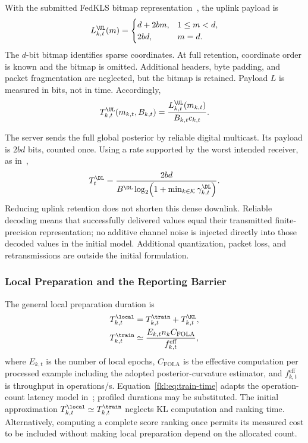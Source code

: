 With the submitted FedKLS bitmap representation~\cite[Sec.~II-B]{fedkls}, the uplink payload is
\begin{equation}
 L_{k,t}^{\UL}(m)=
 \begin{cases}
 d+2bm,&1\le m<d,\\
 2bd,&m=d.
 \end{cases}
 \label{fkl:eq:uplink-payload}
\end{equation}
The $d$-bit bitmap identifies sparse coordinates. At full retention, coordinate order is known and the bitmap is omitted. Additional headers, byte padding, and packet fragmentation are neglected, but the bitmap is retained. Payload $L$ is measured in bits, not in time. Accordingly,
\begin{equation}
 T_{k,t}^{\UL}(m_{k,t},B_{k,t})
 =\frac{L_{k,t}^{\UL}(m_{k,t})}{B_{k,t}c_{k,t}}.
 \label{fkl:eq:upload-time}
\end{equation}

The server sends the full global posterior by reliable digital multicast. Its payload is $2bd$ bits, counted once. Using a rate supported by the worst intended receiver, as in~\cite[Eqs.~(4)--(5)]{scheduling},
\begin{equation}
 T_t^{\DL}=\frac{2bd}{B^{\DL}\log_2\!\left(
 1+\min_{k\in\mathcal K}\gamma_{k,t}^{\DL}\right)}.
 \label{fkl:eq:downlink-time}
\end{equation}
Reducing uplink retention does not shorten this dense downlink. Reliable decoding means that successfully delivered values equal their transmitted finite-precision representation; no additive channel noise is injected directly into those decoded values in the initial model. Additional quantization, packet loss, and retransmissions are outside the initial formulation.

\subsubsection{Local Preparation and the Reporting Barrier}
The general local preparation duration is
\begin{align}
 T_{k,t}^{\local}
 &=T_{k,t}^{\train}+T_{k,t}^{\KL},\label{fkl:eq:local-time}\\
 T_{k,t}^{\train}
 &\simeq\frac{E_{k,t}n_kC_{\mathrm{FOLA}}}
 {f_{k,t}^{\mathrm{eff}}},\label{fkl:eq:train-time}
\end{align}
where $E_{k,t}$ is the number of local epochs, $C_{\mathrm{FOLA}}$ is the effective computation per processed example including the adopted posterior-curvature estimator, and $f_{k,t}^{\mathrm{eff}}$ is throughput in operations/s. Equation~\eqref{fkl:eq:train-time} adapts the operation-count latency model in~\cite[Eq.~(16)]{scheduling}; profiled durations may be substituted. The initial approximation $T_{k,t}^{\local}\simeq T_{k,t}^{\train}$ neglects KL computation and ranking time. Alternatively, computing a complete score ranking once permits its measured cost to be included without making local preparation depend on the allocated count.

